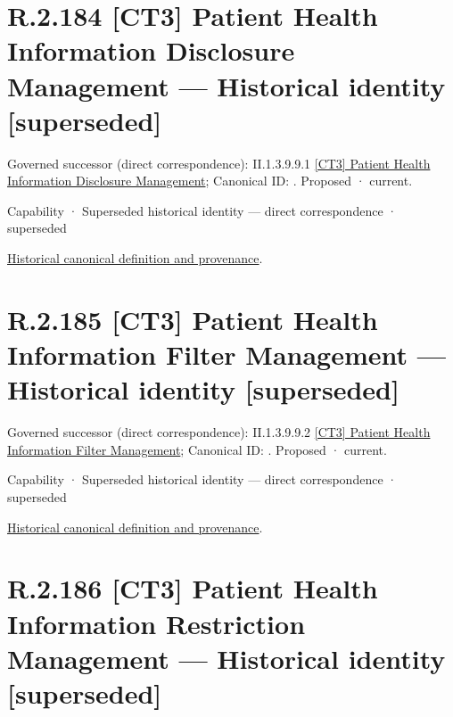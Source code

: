 \section*{R.2.184 [CT3] Patient Health Information Disclosure Management — Historical identity [superseded]}
\label{navigation:R.2.184}

{\small Governed successor (direct correspondence): II.1.3.9.9.1 \hyperref[element:7f918639e23842e78fa92f1bf47c5a7b]{[CT3] Patient Health Information Disclosure Management}; Canonical ID: \texttt{}. Proposed · current.}\par
\label{element:07cf507f183d4905a7ad2adbb8555df5}
{\small Capability · Superseded historical identity — direct correspondence · superseded}\par
\href{../../../../../../../continuum/strategy/capability/07cf507f183d4905a7ad2adbb8555df5.md}{Historical canonical definition and provenance}.\par
\section*{R.2.185 [CT3] Patient Health Information Filter Management — Historical identity [superseded]}
\label{navigation:R.2.185}

{\small Governed successor (direct correspondence): II.1.3.9.9.2 \hyperref[element:62f673613c76494eba972cad3e4e8d0b]{[CT3] Patient Health Information Filter Management}; Canonical ID: \texttt{}. Proposed · current.}\par
\label{element:589f192797454d9e8960fb63774e5e9c}
{\small Capability · Superseded historical identity — direct correspondence · superseded}\par
\href{../../../../../../../continuum/strategy/capability/589f192797454d9e8960fb63774e5e9c.md}{Historical canonical definition and provenance}.\par
\section*{R.2.186 [CT3] Patient Health Information Restriction Management — Historical identity [superseded]}
\label{navigation:R.2.186}

